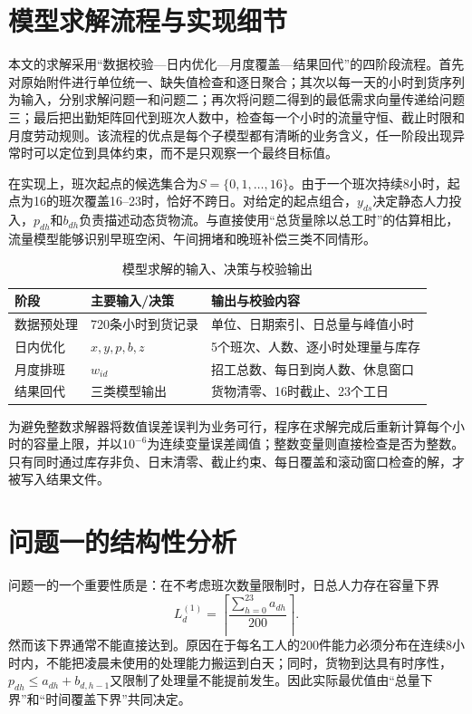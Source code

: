 \section{模型求解流程与实现细节}

本文的求解采用“数据校验—日内优化—月度覆盖—结果回代”的四阶段流程。首先对原始附件进行单位统一、缺失值检查和逐日聚合；其次以每一天的小时到货序列为输入，分别求解问题一和问题二；再次将问题二得到的最低需求向量传递给问题三；最后把出勤矩阵回代到班次人数中，检查每一个小时的流量守恒、截止时限和月度劳动规则。该流程的优点是每个子模型都有清晰的业务含义，任一阶段出现异常时可以定位到具体约束，而不是只观察一个最终目标值。

在实现上，班次起点的候选集合为$S=\{0,1,\ldots,16\}$。由于一个班次持续8小时，起点为16的班次覆盖16--23时，恰好不跨日。对给定的起点组合，$y_{ds}$决定静态人力投入，$p_{dh}$和$b_{dh}$负责描述动态货物流。与直接使用“总货量除以总工时”的估算相比，流量模型能够识别早班空闲、午间拥堵和晚班补偿三类不同情形。

\begin{table}[htbp]
\centering
\caption{模型求解的输入、决策与校验输出}
\label{tab:workflow}
\begin{tabular}{p{}p{}p{}}
\toprule
阶段 & 主要输入/决策 & 输出与校验内容\\
\midrule
数据预处理 & 720条小时到货记录 & 单位、日期索引、日总量与峰值小时\\
日内优化 & $x,y,p,b,z$ & 5个班次、人数、逐小时处理量与库存\\
月度排班 & $w_{id}$ & 招工总数、每日到岗人数、休息窗口\\
结果回代 & 三类模型输出 & 货物清零、16时截止、23个工日\\
\bottomrule
\end{tabular}
\end{table}

为避免整数求解器将数值误差误判为业务可行，程序在求解完成后重新计算每个小时的容量上限，并以$10^{-6}$为连续变量误差阈值；整数变量则直接检查是否为整数。只有同时通过库存非负、日末清零、截止约束、每日覆盖和滚动窗口检查的解，才被写入结果文件。

\section{问题一的结构性分析}

问题一的一个重要性质是：在不考虑班次数量限制时，日总人力存在容量下界
\begin{equation}
 L_d^{(1)}=\left\lceil \frac{\sum_{h=0}^{23}a_{dh}}{200}\right\rceil .
\end{equation}
然而该下界通常不能直接达到。原因在于每名工人的200件能力必须分布在连续8小时内，不能把凌晨未使用的处理能力搬运到白天；同时，货物到达具有时序性，$p_{dh}\le a_{dh}+b_{d,h-1}$又限制了处理量不能提前发生。因此实际最优值由“总量下界”和“时间覆盖下界”共同决定。

